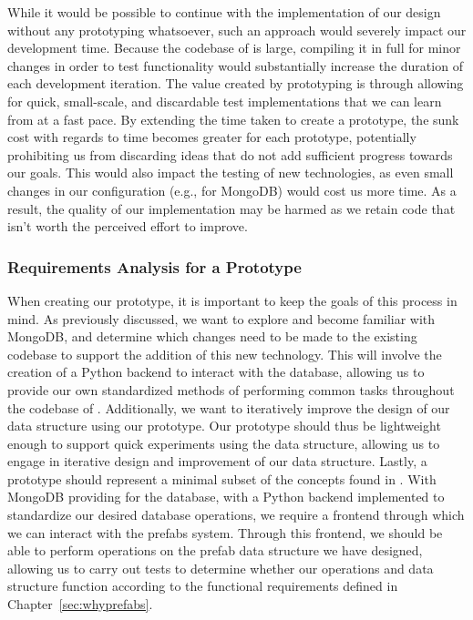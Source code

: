 \documentclass[11pt]{article}
\begin{document}
		While it would be possible to continue with the implementation of our design without any prototyping whatsoever, such an approach would severely impact our development time.
		Because the codebase of \opendc{} is large, compiling it in full for minor changes in order to test functionality would substantially increase the duration of each development iteration.
		The value created by prototyping is through allowing for quick, small-scale, and discardable test implementations that we can learn from at a fast pace.
		By extending the time taken to create a prototype, the sunk cost with regards to time becomes greater for each prototype, potentially prohibiting us from discarding ideas that do not add sufficient progress towards our goals.
		This would also impact the testing of new technologies, as even small changes in our configuration (e.g., for MongoDB) would cost us more time.
		As a result, the quality of our implementation may be harmed as we retain code that isn't worth the perceived effort to improve.
	
	\subsubsection{Requirements Analysis for a Prototype}
		When creating our prototype, it is important to keep the goals of this process in mind.
		As previously discussed, we want to explore and become familiar with MongoDB, and determine which changes need to be made to the existing \opendc{} codebase to support the addition of this new technology.
		This will involve the creation of a Python backend to interact with the database, allowing us to provide our own standardized methods of performing common tasks throughout the codebase of \opendc{}.
		Additionally, we want to iteratively improve the design of our data structure using our prototype.
		Our prototype should thus be lightweight enough to support quick experiments using the data structure, allowing us to engage in iterative design and improvement of our data structure.
		Lastly, a prototype should represent a minimal subset of the concepts found in \opendc{}.
		With MongoDB providing for the database, with a Python backend implemented to standardize our desired database operations, we require a frontend through which we can interact with the prefabs system.
		Through this frontend, we should be able to perform operations on the prefab data structure we have designed, allowing us to carry out tests to determine whether our operations and data structure function according to the functional requirements defined in Chapter~\ref{sec:whyprefabs}.
		
\end{document}
